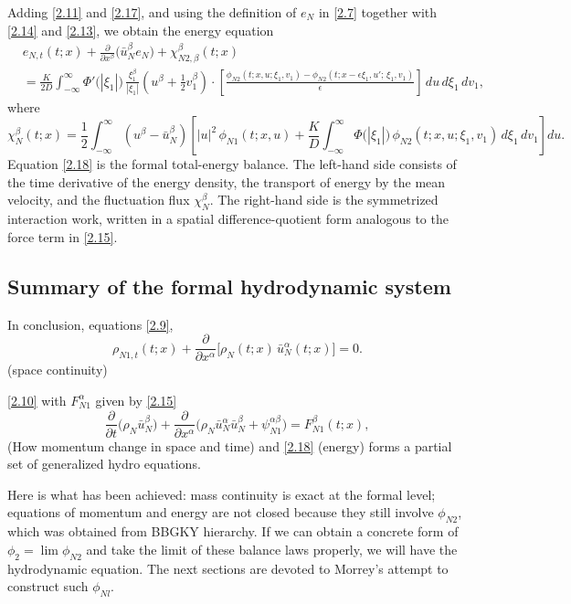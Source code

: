 \documentclass[11pt]{article}
\begin{document}
Adding \eqref{2.11} and \eqref{2.17}, and using the definition of $e_N$ in \eqref{2.7} together with \eqref{2.14} and \eqref{2.13}, we obtain the energy equation
\begin{equation*}\label{2.18}
\begin{aligned}
&e_{N,t}(t;x)
+\frac{\partial}{\partial x^\beta}\big(\bar u_N^\beta e_N\big)
+\chi_{N2,\beta}^\beta(t;x)
\\&=
\frac{K}{2D}
\int_{-\infty}^{\infty}
\Phi'\big(|\xi_1|\big)\,\frac{\xi_1^\beta}{|\xi_1|}
\left(u^\beta+\tfrac12 v_1^\beta\right)
\cdot
\left[
\frac{\phi_{N2}(t;x,u;\xi_1,v_1)-\phi_{N2}(t;x-\epsilon\xi_1,u';\,\xi_1,v_1)}{\epsilon}
\right]\,du\,d\xi_1\,dv_1,
\end{aligned}
\tag{2.18}
\end{equation*}
where
\[
\chi_N^\beta(t;x)
=
\frac{1}{2}\int_{-\infty}^{\infty}(u^\beta-\bar u_N^\beta)
\left[
 |u|^2\,\phi_{N1}(t;x,u)
+\frac{K}{D}\int_{-\infty}^{\infty}\Phi\big(|\xi_1|\big)\,\phi_{N2}(t;x,u;\xi_1,v_1)\,d\xi_1\,dv_1
\right]du.
\]
Equation \eqref{2.18} is the formal total-energy balance. The left-hand side consists of the time derivative of the energy density, the transport of energy by the mean velocity, and the fluctuation flux $\chi_N^\beta$. The right-hand side is the symmetrized interaction work, written in a spatial difference-quotient form analogous to the force term in \eqref{2.15}.

\subsection{Summary of the formal hydrodynamic system}
In conclusion, equations \eqref{2.9}, 
\begin{equation*}
\rho_{N1,t}(t;x)+\frac{\partial}{\partial x^\alpha}\!\big[\rho_N(t;x)\,\bar{u}_N^\alpha(t;x)\big]=0.
\end{equation*} (space continuity)

\eqref{2.10} with $F^\alpha_{N1}$ given by \eqref{2.15} 
\begin{equation*}
    \frac{\partial}{\partial t}\big(\rho_N\bar u_N^\beta\big)
+\frac{\partial}{\partial x^\alpha}
\big(\rho_N\bar u_N^\alpha \bar u_N^\beta+\psi_{N1}^{\alpha\beta}\big)
=F_{N1}^\beta(t;x),
\end{equation*} (How momentum change in space and time)
and \eqref{2.18} (energy) forms a partial set of generalized hydro equations.

Here is what has been achieved: mass continuity is exact at the formal level; equations of momentum and energy are not closed because they still involve $\phi_{N2}$, which was obtained from BBGKY hierarchy. If we can obtain a concrete form of $\phi_2=\lim \phi_{N2}$ and take the limit of these balance laws properly, we will have the hydrodynamic equation. The next sections are devoted to Morrey’s attempt to construct such $\phi_{Nl}$.
\end{document}
